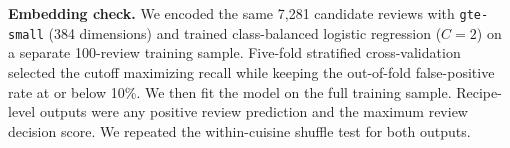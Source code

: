 \textbf{Embedding check.} We encoded the same 7,281 candidate reviews with \texttt{gte-small} (384 dimensions) and trained class-balanced logistic regression ($C=2$) on a separate 100-review training sample. Five-fold stratified cross-validation selected the cutoff maximizing recall while keeping the out-of-fold false-positive rate at or below 10\%. We then fit the model on the full training sample. Recipe-level outputs were any positive review prediction and the maximum review decision score. We repeated the within-cuisine shuffle test for both outputs.
